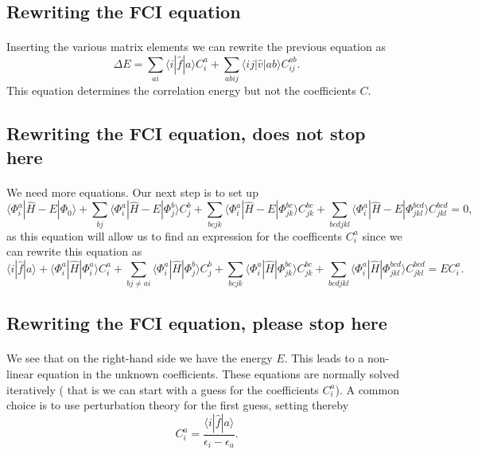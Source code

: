 \subsection*{Rewriting the FCI equation}

\paragraph{}
Inserting the various matrix elements we can rewrite the previous equation as
\[
\Delta E=\sum_{ai}\langle i| \hat{f}|a \rangle C_{i}^{a}+
\sum_{abij}\langle ij | \hat{v}| ab \rangle C_{ij}^{ab}.
\]
This equation determines the correlation energy but not the coefficients $C$.



\subsection*{Rewriting the FCI equation, does not stop here}

\paragraph{}
We need more equations. Our next step is to set up
\[
\langle \Phi_i^a | \hat{H} -E| \Phi_0\rangle + \sum_{bj}\langle \Phi_i^a | \hat{H} -E|\Phi_{j}^{b} \rangle C_{j}^{b}+
\sum_{bcjk}\langle \Phi_i^a | \hat{H} -E|\Phi_{jk}^{bc} \rangle C_{jk}^{bc}+
\sum_{bcdjkl}\langle \Phi_i^a | \hat{H} -E|\Phi_{jkl}^{bcd} \rangle C_{jkl}^{bcd}=0,
\]
as this equation will allow us to find an expression for the coefficents $C_i^a$ since we can rewrite this equation as 
\[
\langle i | \hat{f}| a\rangle +\langle \Phi_i^a | \hat{H}|\Phi_{i}^{a} \rangle C_{i}^{a}+ \sum_{bj\ne ai}\langle \Phi_i^a | \hat{H}|\Phi_{j}^{b} \rangle C_{j}^{b}+
\sum_{bcjk}\langle \Phi_i^a | \hat{H}|\Phi_{jk}^{bc} \rangle C_{jk}^{bc}+
\sum_{bcdjkl}\langle \Phi_i^a | \hat{H}|\Phi_{jkl}^{bcd} \rangle C_{jkl}^{bcd}=EC_i^a.
\]



\subsection*{Rewriting the FCI equation, please stop here}

\paragraph{}
We see that on the right-hand side we have the energy $E$. This leads to a non-linear equation in the unknown coefficients. 
These equations are normally solved iteratively ( that is we can start with a guess for the coefficients $C_i^a$). A common choice is to use perturbation theory for the first guess, setting thereby
\[
 C_{i}^{a}=\frac{\langle i | \hat{f}| a\rangle}{\epsilon_i-\epsilon_a}.
\]



